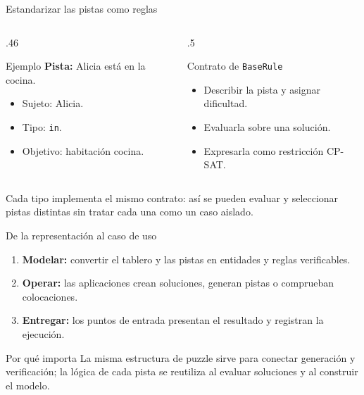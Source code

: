 \documentclass[aspectratio=169,11pt]{beamer}
\begin{document}
\begin{frame}{Estandarizar las pistas como reglas}
  \begin{columns}[T,onlytextwidth]
    \begin{column}{.46\textwidth}
      \begin{block}{Ejemplo}
        \textbf{Pista:} Alicia est\'a en la cocina.
        \begin{itemize}
          \item Sujeto: Alicia.
          \item Tipo: \texttt{in}.
          \item Objetivo: habitaci\'on cocina.
        \end{itemize}
      \end{block}
    \end{column}
    \begin{column}{.5\textwidth}
      \begin{block}{Contrato de \texttt{BaseRule}}
        \begin{itemize}
          \item Describir la pista y asignar dificultad.
          \item Evaluarla sobre una soluci\'on.
          \item Expresarla como restricci\'on CP-SAT.
        \end{itemize}
      \end{block}
    \end{column}
  \end{columns}
  \vspace{2mm}
  \small Cada tipo implementa el mismo contrato: as\'i se pueden
  evaluar y seleccionar pistas distintas sin tratar cada una
  como un caso aislado.
\end{frame}

\begin{frame}{De la representaci\'on al caso de uso}
  \begin{enumerate}
    \setlength{\itemsep}{3mm}
    \item \textbf{Modelar:} convertir el tablero y las pistas
      en entidades y reglas verificables.
    \item \textbf{Operar:} las aplicaciones crean soluciones,
      generan pistas o comprueban colocaciones.
    \item \textbf{Entregar:} los puntos de entrada presentan el
      resultado y registran la ejecuci\'on.
  \end{enumerate}
  \begin{exampleblock}{Por qu\'e importa}
    La misma estructura de puzzle sirve para conectar generaci\'on
    y verificaci\'on; la l\'ogica de cada pista se reutiliza al evaluar
    soluciones y al construir el modelo.
  \end{exampleblock}
\end{frame}
\end{document}
